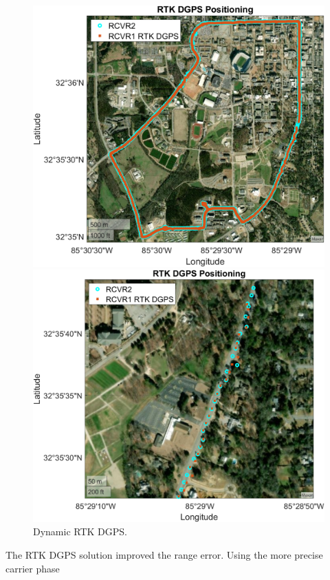 \documentclass[11pt]{article}
\begin{document}
\begin{enumerate}[label=\textbf{\arabic*.}]
\begin{figure}[H]
\begin{minipage}[b]{0.49\textwidth}
          \includegraphics[width=\textwidth]{p3_d.png}
        \end{minipage}
        \begin{minipage}[b]{0.49\textwidth}
          \includegraphics[width=\textwidth]{p3_d1.png}
        \end{minipage}
        \caption{Dynamic RTK DGPS.}
      \end{figure}
      The RTK DGPS solution improved the range error. Using the more precise carrier phase 

\end{enumerate}
\end{document}
